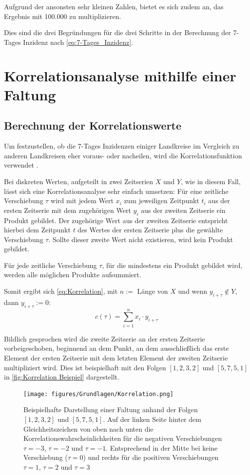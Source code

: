 Aufgrund der ansonsten sehr kleinen Zahlen, bietet es sich zudem an, das Ergebnis mit 100.000 zu multiplizieren.

Dies sind die drei Begründungen für die drei Schritte in der Berechnung der 7-Tages Inzidenz nach \autoref{eq:7-Tages_Inzidenz}.


\section{Korrelationsanalyse mithilfe einer Faltung}\label{sec:BeschreibungKorrelationsanalyse}
\subsection{Berechnung der Korrelationswerte}\label{Grundlagen:Berechnung der Korrelationwerte}
Um festzustellen, ob die 7-Tages Inzidenzen einiger Landkreise im Vergleich zu anderen Landkreisen eher voraus- oder nacheilen, wird die Korrelationsfunktion verwendet \autocite{Korrelation}.

Bei diskreten Werten, aufgeteilt in zwei Zeitserien $X$ und $Y$, wie in diesem Fall, lässt sich eine Korrelationsanalyse sehr einfach umsetzen:
Für eine zeitliche Verschiebung $\tau$ wird mit jedem Wert $x_i$ zum jeweiligen Zeitpunkt $t_i$ aus der ersten Zeitserie mit dem zugehörigen Wert $y_i$ aus der zweiten Zeitserie ein Produkt gebildet. Der zugehörige Wert aus der zweiten Zeitserie entspricht hierbei dem Zeitpunkt $t$ des Wertes der ersten Zeitserie plus die gewählte Verschiebung $\tau$. Sollte dieser zweite Wert nicht existieren, wird kein Produkt gebildet.

Für jede zeitliche Verschiebung $\tau$, für die mindestens ein Produkt gebildet wird, werden alle möglichen Produkte aufsummiert.

Somit ergibt sich \autoref{eq:Korrelation}, mit $n := $ Länge von $X$ und wenn $y_{i+\tau} \not\in Y$, dann $y_{i+\tau} := 0$:
\begin{equation}\label{eq:Korrelation}
    c(\tau) = \sum_{i=1}^n x_i\cdot y_{i+\tau}
\end{equation}


Bildlich gesprochen wird die zweite Zeitserie an der ersten Zeitserie vorbeigeschoben, beginnend an dem Punkt, an dem ausschließlich das erste Element der ersten Zeitserie mit dem letzten Element der zweiten Zeitserie multipliziert wird. Dies ist beispielhaft mit den Folgen $[1,2,3,2]$ und $[5,7,5,1]$ in \autoref{fig:Korrelation Beispiel} dargestellt.

\begin{figure}[H]
    \centering
    \texttt{[image: figures/Grundlagen/Korrelation.png]}
    \caption{Beispielhafte Darstellung einer Faltung anhand der Folgen $[1,2,3,2]$ und $[5,7,5,1]$. Auf der linken Seite hinter dem Gleichheitszeichen von oben nach unten die Korrelationswahrscheinlichkeiten für die negativen Verschiebungen $\tau=-3$, $\tau=-2$ und $\tau=-1$. Entsprechend in der Mitte bei keine Verschiebung ($\tau=0$) und rechts für die positiven Verschiebungen $\tau=1$, $\tau=2$ und $\tau=3$}
    \label{fig:Korrelation Beispiel}
\end{figure}

